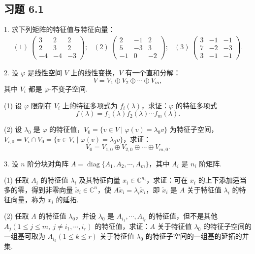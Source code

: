 \documentclass[UTF8, 12pt, fontset=fandol, oneside]{ctexart}
\begin{document}
\subsection*{习题 6.1}

1. 求下列矩阵的特征值与特征向量：
\[
\begin{array}{ccc}
(1)\ \left(\begin{array}{ccc}
3 & 2 & 2\\
2 & 3 & 2\\
-4 & -4 & -3
\end{array}\right);&
(2)\ \left(\begin{array}{ccc}
2 & -1 & 2\\
5 & -3 & 3\\
-1 & 0 & -2
\end{array}\right);&
(3)\ \left(\begin{array}{ccc}
3 & -1 & -1\\
7 & -2 & -3\\
3 & -1 & -1
\end{array}\right).
\end{array}
\]

2. 设 $\varphi$ 是线性空间 $V$ 上的线性变换，$V$ 有一个直和分解：
\[
V=V_1\oplus V_2\oplus\cdots\oplus V_m,
\]
其中 $V_i$ 都是 $\varphi$-不变子空间.

(1) 设 $\varphi$ 限制在 $V_i$ 上的特征多项式为 $f_i(\lambda)$，求证：$\varphi$ 的特征多项式
\[
f(\lambda)=f_1(\lambda)f_2(\lambda)\cdots f_m(\lambda).
\]

(2) 设 $\lambda_0$ 是 $\varphi$ 的特征值，$V_0=\{v\in V\mid \varphi(v)=\lambda_0v\}$ 为特征子空间，$V_{i,0}=V_i\cap V_0=\{v\in V_i\mid \varphi(v)=\lambda_0v\}$，求证：
\[
V_0=V_{1,0}\oplus V_{2,0}\oplus\cdots\oplus V_{m,0}.
\]

3. 设 $n$ 阶分块对角阵 $A=\operatorname{diag}\{A_1,A_2,\cdots,A_m\}$，其中 $A_i$ 是 $n_i$ 阶矩阵.

(1) 任取 $A_i$ 的特征值 $\lambda_i$ 及其特征向量 $x_i\in\mathbb{C}^{n_i}$，求证：可在 $x_i$ 的上下添加适当多的零，得到非零向量 $\widetilde{x}_i\in\mathbb{C}^n$，使 $A\widetilde{x}_i=\lambda_i\widetilde{x}_i$，即 $\widetilde{x}_i$ 是 $A$ 关于特征值 $\lambda_i$ 的特征向量，称为 $x_i$ 的延拓.

(2) 任取 $A$ 的特征值 $\lambda_0$，并设 $\lambda_0$ 是 $A_{i_1},\cdots,A_{i_r}$ 的特征值，但不是其他 $A_j(1\leq j\leq m,\ j\neq i_1,\cdots,i_r)$ 的特征值，求证：$A$ 关于特征值 $\lambda_0$ 的特征子空间的一组基可取为 $A_{i_k}(1\leq k\leq r)$ 关于特征值 $\lambda_0$ 的特征子空间的一组基的延拓的并集.
\end{document}
